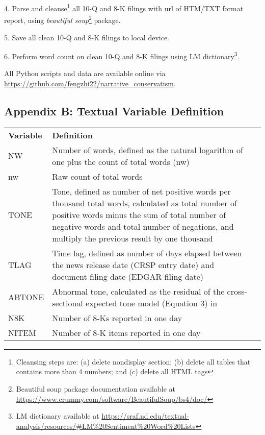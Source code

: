 4. Parse and cleanse\footnote{Cleansing steps are: (a) delete nondisplay section; (b) delete all tables that contains more than 4 numbers; and (c) delete all HTML tags} all 10-Q and 8-K filings with url of HTM/TXT format report, using \textit{beautiful soup}\footnote{Beautiful soup package documentation available at \url{https://www.crummy.com/software/BeautifulSoup/bs4/doc/}} package. 

5. Save all clean 10-Q and 8-K filings to local device. 

6. Perform word count on clean 10-Q and 8-K filings using LM dictionary\footnote{LM dictionary available at \url{https://sraf.nd.edu/textual-analysis/resources/\#LM\%20Sentiment\%20Word\%20Lists}}. 

All Python scripts and data are available online via \url{https://github.com/fengzhi22/narrative_conservatism}.

\subsection*{Appendix B: Textual Variable Definition}
\label{appb}
\begin{table}[H]
	\centering
	\begin{tabular}{lp{15cm}p{15cm}}
		\textbf{Variable} & \textbf{Definition} \\
		NW & Number of words, defined as the natural logarithm of one plus the count of total words (nw)\\
		nw & Raw count of total words\\
		TONE & Tone, defined as number of net positive words per thousand total words, calculated as total number of positive words minus the sum of total number of negative words and total number of negations, and multiply the previous result by one thousand\\
		TLAG & Time lag, defined as number of days elapsed between the news release date (CRSP entry date) and document filing date (EDGAR filing date)\\
		ABTONE & Abnormal tone, calculated as the residual of the cross-sectional expected tone model (Equation 3) in \citet*{huangToneManagement2014}\\
		N8K & Number of 8-Ks reported in one day\\
		NITEM & Number of 8-K items reported in one day\\
		
	\end{tabular}%
\end{table}%

